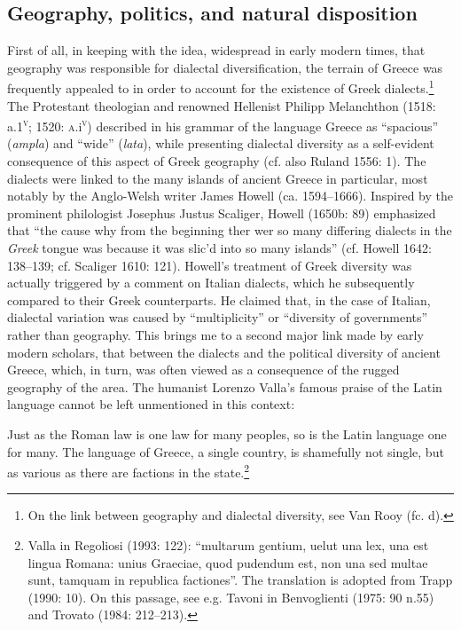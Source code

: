 \subsection{Geography, politics, and natural disposition}
\hypertarget{Toc19704854}{}\begin{styleStandard}
First of all, in keeping with the idea, widespread in early modern times, that geography was responsible for dialectal diversification, the terrain of Greece was frequently appealed to in order to account for the existence of Greek dialects.\footnote{ On the link between geography and dialectal diversity, see Van Rooy (fc. d).} The Protestant theologian and renowned Hellenist Philipp Melanchthon (1518: a.1\textsc{\textsuperscript{v}}; 1520: \textsc{a.}i\textsc{\textsuperscript{v}}) described in his grammar of the language Greece as “spacious” (\textit{ampla}) and “wide” (\textit{lata}), while presenting dialectal diversity as a self-evident consequence of this aspect of Greek geography (cf. also Ruland 1556: 1). The dialects were linked to the many islands of ancient Greece in particular, most notably by the Anglo-Welsh writer James Howell (ca. 1594–1666). Inspired by the prominent philologist Josephus Justus Scaliger, Howell (1650b: 89) emphasized that “the cause why from the beginning ther wer so many differing dialects in the \textit{Greek} tongue was because it was slic’d into so many islands” (cf. Howell 1642: 138–139; cf. Scaliger 1610: 121). Howell’s treatment of Greek diversity was actually triggered by a comment on Italian dialects, which he subsequently compared to their Greek counterparts. He claimed that, in the case of Italian, dialectal variation was caused by “multiplicity” or “diversity of governments” rather than geography. This brings me to a second major link made by early modern scholars, that between the dialects and the political diversity of ancient Greece, which, in turn, was often viewed as a consequence of the rugged geography of the area. The humanist Lorenzo Valla’s famous praise of the Latin language cannot be left unmentioned in this context:
\end{styleStandard}

\begin{styleQuote}
Just as the Roman law is one law for many peoples, so is the Latin language one for many. The language of Greece, a single country, is shamefully not single, but as various as there are factions in the state.\footnote{ Valla in Regoliosi (1993: 122): “multarum gentium, uelut una lex, una est lingua Romana: unius Graeciae, quod pudendum est, non una sed multae sunt, tamquam in republica factiones”. The translation is adopted from Trapp (1990: 10). On this passage, see e.g. Tavoni in Benvoglienti (1975: 90 n.55) and Trovato (1984: 212–213).}
\end{styleQuote}

